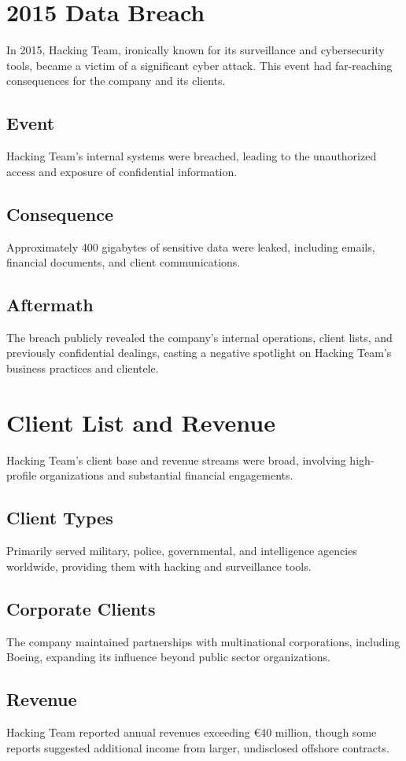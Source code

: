 \section{2015 Data Breach}
In 2015, Hacking Team, ironically known for its surveillance and cybersecurity tools, became a victim of a significant cyber attack. This event had far-reaching consequences for the company and its clients.
\subsection{Event}
Hacking Team's internal systems were breached, leading to the unauthorized access and exposure of confidential information.
\subsection{Consequence}
Approximately 400 gigabytes of sensitive data were leaked, including emails, financial documents, and client communications.
\subsection{Aftermath}
The breach publicly revealed the company's internal operations, client lists, and previously confidential dealings, casting a negative spotlight on Hacking Team’s business practices and clientele.

\section{Client List and Revenue}
Hacking Team's client base and revenue streams were broad, involving high-profile organizations and substantial financial engagements.
\subsection{Client Types}
Primarily served military, police, governmental, and intelligence agencies worldwide, providing them with hacking and surveillance tools.
\subsection{Corporate Clients}
The company maintained partnerships with multinational corporations, including Boeing, expanding its influence beyond public sector organizations.
\subsection{Revenue}
Hacking Team reported annual revenues exceeding €40 million, though some reports suggested additional income from larger, undisclosed offshore contracts.

